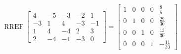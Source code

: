 \begin{exerciseAnswer} 


\[\operatorname{RREF} \left[\begin{array}{ccccc}
4 & -5 & -3 & -2 & 1 \\
-3 & 1 & 4 & -3 & -1 \\
1 & 4 & -4 & 2 & 3 \\
2 & -4 & -1 & -3 & 0
\end{array}\right] = \left[\begin{array}{ccccc}
1 & 0 & 0 & 0 & \frac{8}{5} \\
0 & 1 & 0 & 0 & \frac{29}{30} \\
0 & 0 & 1 & 0 & \frac{13}{30} \\
0 & 0 & 0 & 1 & -\frac{11}{30}
\end{array}\right] \]



\end{exerciseAnswer}
